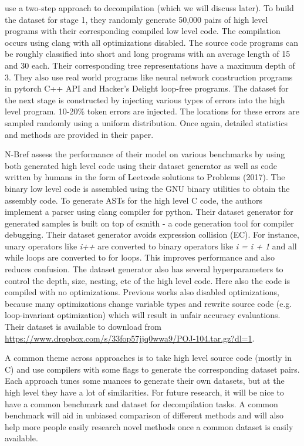 \documentclass{article}
\begin{document}
\citet{coda} use a two-step approach to decompilation (which we will discuss later). To build the dataset for stage 1, they randomly generate 50,000 pairs of high level programs with their corresponding compiled low level code. The compilation occurs using clang with all optimizations disabled. The source code programs can be roughly classified into short and long programs with an average length of 15 and 30 each. Their corresponding tree representations have a maximum depth of 3. They also use real world programs like neural network construction programs in pytorch C++ API and Hacker’s Delight loop-free programs. The dataset for the next stage is constructed by injecting various types of errors into the high level program. 10-20\% token errors are injected. The locations for these errors are sampled randomly using a uniform distribution. Once again, detailed statistics and methods are provided in their paper.

N-Bref \cite{nbref} assess the performance of their model on various benchmarks by using both generated high level code using their dataset generator as well as code written by humans in the form of Leetcode solutions to Problems (2017). The binary low level code is assembled using the GNU binary utilities to obtain the assembly code. To generate ASTs for the high level C code, the authors implement a parser using clang compiler for python. Their dataset generator for generated samples is built on top of csmith \cite{yang2011finding} - a code generation tool for compiler debugging. Their dataset generator avoids expression collision (EC). For instance, unary operators like \textit{i++} are converted to binary operators like \textit{i = i + 1} and all while loops are converted to for loops. This improves performance and also reduces confusion. The dataset generator also has several hyperparameters to control the depth, size, nesting, etc of the high level code. Here also the code is compiled with no optimizations. Previous works \cite{brumley2013native,lee2011tie,lin2010automatic} also
disabled optimizations, because many optimizations change variable types and rewrite source code
(e.g. loop-invariant optimization) which will result in unfair accuracy evaluations. Their dataset is available to download from \url{https://www.dropbox.com/s/33fop57jjq0wwa9/POJ-104.tar.gz?dl=1}.

A common theme across approaches is to take high level source code (mostly in C) and use compilers with some flags to generate the corresponding dataset pairs. Each approach tunes some nuances to generate their own datasets, but at the high level they have a lot of similarities. For future research, it will be nice to have a common benchmark and dataset for decompilation tasks. A common benchmark will aid in unbiased comparison of different methods and will also help more people easily research novel methods once a common dataset is easily available.
\end{document}
